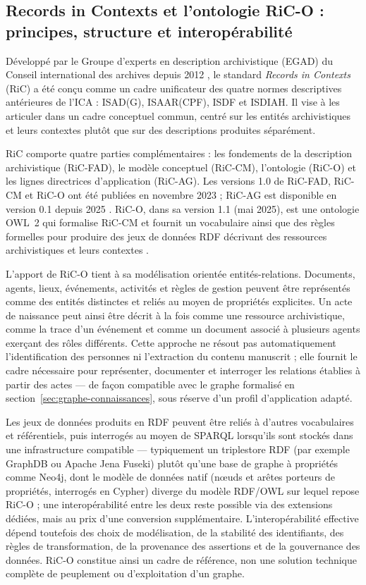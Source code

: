 \subsection{Records in Contexts et l'ontologie RiC-O : principes, structure et interopérabilité}
\label{sec:ric-o}

Développé par le Groupe d'experts en description archivistique (EGAD) du Conseil international des archives depuis 2012 \cite{ica2023ricrelease}, le standard \textit{Records in Contexts} (RiC) a été conçu comme un cadre unificateur des quatre normes descriptives antérieures de l'ICA : ISAD(G), ISAAR(CPF), ISDF et ISDIAH. Il vise à les articuler dans un cadre conceptuel commun, centré sur les entités archivistiques et leurs contextes plutôt que sur des descriptions produites séparément.

RiC comporte quatre parties complémentaires : les fondements de la description archivistique (RiC-FAD), le modèle conceptuel (RiC-CM), l'ontologie (RiC-O) et les lignes directrices d'application (RiC-AG).
Les versions 1.0 de RiC-FAD, RiC-CM et RiC-O ont été publiées en novembre 2023 ; RiC-AG est disponible en version 0.1 depuis 2025 \cite{ica2023ricrelease,clavaud2025ric}.
RiC-O, dans sa version 1.1 (mai 2025), est une ontologie OWL~2 qui formalise RiC-CM et fournit un vocabulaire ainsi que des règles formelles pour produire des jeux de données RDF décrivant des ressources archivistiques et leurs contextes \cite{icaegad2025rico11,clavaudica}.

L'apport de RiC-O tient à sa modélisation orientée entités-relations. Documents, agents, lieux, événements, activités et règles de gestion peuvent être représentés comme des entités distinctes et reliés au moyen de propriétés explicites.
Un acte de naissance peut ainsi être décrit à la fois comme une ressource archivistique, comme la trace d'un événement et comme un document associé à plusieurs agents exerçant des rôles différents.
Cette approche ne résout pas automatiquement l'identification des personnes ni l'extraction du contenu manuscrit ; elle fournit le cadre nécessaire pour représenter, documenter et interroger les relations établies à partir des actes --- de façon compatible avec le graphe formalisé en section~\ref{sec:graphe-connaissances}, sous réserve d'un profil d'application adapté.

Les jeux de données produits en RDF peuvent être reliés à d'autres vocabulaires et référentiels, puis interrogés au moyen de SPARQL \cite{w3c2013sparql} lorsqu'ils sont stockés dans une infrastructure compatible --- typiquement un triplestore RDF (par exemple GraphDB ou Apache Jena Fuseki) plutôt qu'une base de graphe à propriétés comme Neo4j, dont le modèle de données natif (nœuds et arêtes porteurs de propriétés, interrogés en Cypher) diverge du modèle RDF/OWL sur lequel repose RiC-O ; une interopérabilité entre les deux reste possible via des extensions dédiées, mais au prix d'une conversion supplémentaire.
L'interopérabilité effective dépend toutefois des choix de modélisation, de la stabilité des identifiants, des règles de transformation, de la provenance des assertions et de la gouvernance des données.
RiC-O constitue ainsi un cadre de référence, non une solution technique complète de peuplement ou d'exploitation d'un graphe.


